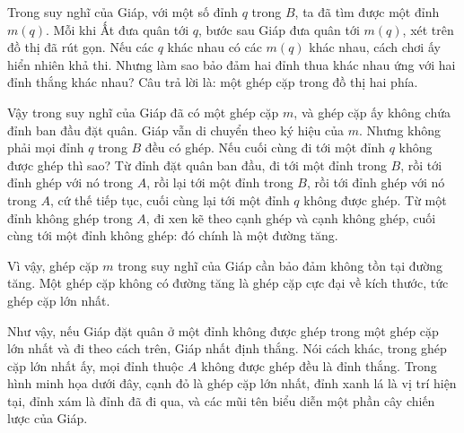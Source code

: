 \documentclass[11pt]{article}
\begin{document}
Trong suy nghĩ của Giáp, với một số đỉnh \(q\) trong \(B\), ta đã tìm được một
đỉnh \(m(q)\). Mỗi khi Ất đưa quân tới \(q\), bước sau Giáp đưa quân tới
\(m(q)\), xét trên đồ thị đã rút gọn. Nếu các \(q\) khác nhau có các
\(m(q)\) khác nhau, cách chơi ấy hiển nhiên khả thi. Nhưng làm sao bảo đảm hai
đỉnh thua khác nhau ứng với hai đỉnh thắng khác nhau? Câu trả lời là: một
ghép cặp trong đồ thị hai phía.

Vậy trong suy nghĩ của Giáp đã có một ghép cặp \(m\), và ghép cặp ấy không
chứa đỉnh ban đầu đặt quân. Giáp vẫn di chuyển theo ký hiệu của \(m\). Nhưng
không phải mọi đỉnh \(q\) trong \(B\) đều có ghép. Nếu cuối cùng đi tới một
đỉnh \(q\) không được ghép thì sao? Từ đỉnh đặt quân ban đầu, đi tới một đỉnh
trong \(B\), rồi tới đỉnh ghép với nó trong \(A\), rồi lại tới một đỉnh trong
\(B\), rồi tới đỉnh ghép với nó trong \(A\), cứ thế tiếp tục, cuối cùng lại
tới một đỉnh \(q\) không được ghép. Từ một đỉnh không ghép trong \(A\), đi xen
kẽ theo cạnh ghép và cạnh không ghép, cuối cùng tới một đỉnh không ghép: đó
chính là một đường tăng.

Vì vậy, ghép cặp \(m\) trong suy nghĩ của Giáp cần bảo đảm không tồn tại đường
tăng. Một ghép cặp không có đường tăng là ghép cặp cực đại về kích thước, tức
ghép cặp lớn nhất.

Như vậy, nếu Giáp đặt quân ở một đỉnh không được ghép trong một ghép cặp lớn
nhất và đi theo cách trên, Giáp nhất định thắng. Nói cách khác, trong ghép cặp
lớn nhất ấy, mọi đỉnh thuộc \(A\) không được ghép đều là đỉnh thắng. Trong
hình minh họa dưới đây, cạnh đỏ là ghép cặp lớn nhất, đỉnh xanh lá là vị trí
hiện tại, đỉnh xám là đỉnh đã đi qua, và các mũi tên biểu diễn một phần cây
chiến lược của Giáp.
\end{document}
